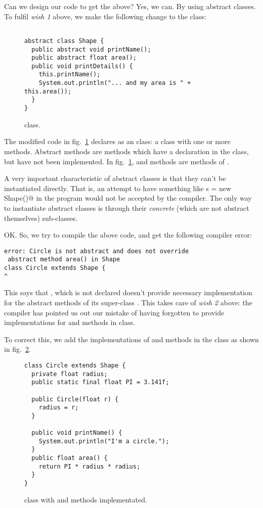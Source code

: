 \documentclass[12pt,a4paper]{article}
\begin{document}
Can we design our code to get the above? Yes, we can. By using abstract classes.
To fulfil \emph{wish 1} above, we make the following change to the \lstinline@Shape@ class:
\begin{figure}[H]
\begin{lstlisting}[frame=single]

abstract class Shape {
  public abstract void printName();
  public abstract float area();
  public void printDetails() {
    this.printName();
    System.out.println("... and my area is " + this.area());
  }
}
\end{lstlisting}
\caption{\lstinline@Circle@ class.}
\label{f:sh2}
\end{figure}

The modified code in fig.~\ref{f:sh2} declares \lstinline@Shape@ as an \lstinline@abstract@ class: a class with one or more \lstinline@abstract@ methods. Abstract methods are methods which have a declaration in the class, but have not been implemented. In fig.~\ref{f:sh2}, \lstinline@printName@ and \lstinline@area@ methods are \lstinline@abstract@ methods of \lstinline@Shape@.

A very important characteristic of abstract classes is that they can't be instantiated directly. That is, an attempt to have something like \lstinline@Shape s = new Shape()@ in the program would not be accepted by the compiler. The only way to instantiate abstract classes is through their \emph{concrete} (which are not abstract themselves) sub-classes.

OK. So, we try to compile the above code, and get the following compiler error:
\begin{lstlisting}[frame=single]
error: Circle is not abstract and does not override
 abstract method area() in Shape
class Circle extends Shape {
^
\end{lstlisting}

This says that \lstinline@Circle@, which is not declared \lstinline@abstract@ doesn't provide necessary implementation for the abstract methods of its super-class \lstinline@Shape@. This takes care of \emph{wish 2} above: the compiler has pointed us out our mistake of having forgotten to provide implementations for \lstinline@printName@ and \lstinline@area@ methods in \lstinline@Circle@ class.

To correct this, we add the implementations of \lstinline@printName@ and \lstinline@area@ methods in the \lstinline@Circle@ class as shown in fig.~\ref{f:cir2}.
\begin{figure}[H]
\begin{lstlisting}[frame=single]
class Circle extends Shape {
  private float radius;
  public static final float PI = 3.141f;

  public Circle(float r) {
    radius = r;
  }

  public void printName() {
    System.out.println("I'm a circle.");
  }
  public float area() {
    return PI * radius * radius;
  }
}
\end{lstlisting}
\caption{\lstinline@Circle@ class with \lstinline@printName@ and \lstinline@area@ methods implementated.}
\label{f:cir2}
\end{figure}
\end{document}

